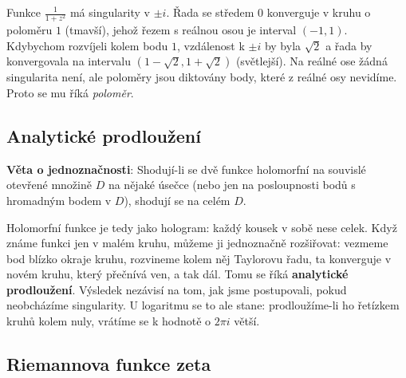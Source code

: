 Funkce $\frac{1}{1 + z^2}$ má singularity v $\pm i$. Řada se středem $0$ konverguje v kruhu o poloměru $1$ (tmavší), jehož řezem s reálnou osou je interval $(-1, 1)$. Kdybychom rozvíjeli kolem bodu $1$, vzdálenost k $\pm i$ by byla $\sqrt{2}$ a řada by konvergovala na intervalu $(1 - \sqrt{2}, 1 + \sqrt{2})$ (světlejší). Na reálné ose žádná singularita není, ale poloměry jsou diktovány body, které z reálné osy nevidíme. Proto se mu říká \textit{poloměr}.

\subsection{Analytické prodloužení}

\begin{definitionbox}
  \textbf{Věta o jednoznačnosti}: Shodují-li se dvě funkce holomorfní na souvislé otevřené množině $D$ na nějaké úsečce (nebo jen na posloupnosti bodů s hromadným bodem v $D$), shodují se na celém $D$.
\end{definitionbox}

Holomorfní funkce je tedy jako hologram: každý kousek v sobě nese celek. Když známe funkci jen v malém kruhu, můžeme ji jednoznačně rozšiřovat: vezmeme bod blízko okraje kruhu, rozvineme kolem něj Taylorovu řadu, ta konverguje v novém kruhu, který přečnívá ven, a tak dál. Tomu se říká \textbf{analytické prodloužení}. Výsledek nezávisí na tom, jak jsme postupovali, pokud neobcházíme singularity. U logaritmu se to ale stane: prodloužíme-li ho řetízkem kruhů kolem nuly, vrátíme se k hodnotě o $2\pi i$ větší.

\begin{center}
\end{center}

\subsection{Riemannova funkce zeta}

